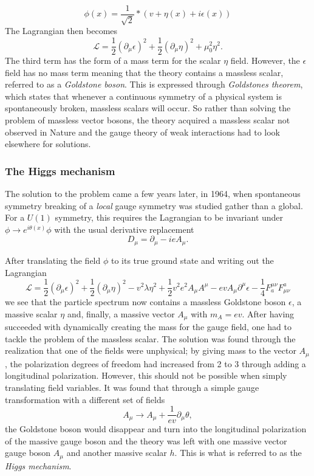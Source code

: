 \begin{equation}
\phi(x) = \frac{1}{\sqrt{2}}*(v+\eta(x)+i\epsilon(x))
\end{equation}
 The Lagrangian then becomes
\begin{equation}
\mathcal{L} = \frac{1}{2}(\partial_{\mu}\epsilon)^2 + \frac{1}{2}(\partial_{\mu}\eta)^2+\mu_0^2\eta^2.
\end{equation}
The third term has the form of a mass term for the scalar $\eta$ field. However, the $\epsilon$ field has no mass term meaning that the theory contains a massless scalar, referred to as a \emph{Goldstone boson}. This is expressed through \emph{Goldstones theorem}, which states that whenever a continuous symmetry of a physical system is spontaneously broken, massless scalars will occur. So rather than solving the problem of massless vector bosons, the theory acquired a massless scalar not observed in Nature and the gauge theory of weak interactions had to look elsewhere for solutions.

\subsubsection{The Higgs mechanism}
The solution to the problem came a few years later, in 1964, when spontaneous symmetry breaking of a \emph{local} gauge symmetry was studied gather than a global. For a $U(1)$ symmetry, this requires the Lagrangian to be invariant under $\phi \rightarrow e^{i\theta(x)}\phi$ with the usual derivative replacement
\begin{equation}
D_{\mu}=\partial_{\mu}-ie A_{\mu}.
\end{equation}

After translating the field $\phi$ to its true ground state and writing out the Lagrangian
\begin{equation}
  \label{eq:theory:higgsL}
\mathcal{L} = \frac{1}{2}(\partial_{\mu}\epsilon)^2 + \frac{1}{2}(\partial_{\mu}\eta)^2-v^2\lambda \eta^2+\frac{1}{2}v^2 e^2 A_{\mu} A^{\mu}-ev A_{\mu}\partial^{\mu}\epsilon-\frac{1}{4}F_{a}^{\mu\nu}F^{a}_{\mu\nu}
\end{equation}
we see that the particle spectrum now contains a massless Goldstone boson $\epsilon$, a massive scalar $\eta$ and, finally, a massive vector $A_{\mu}$ with $m_A=ev$. After having succeeded with dynamically creating the mass for the gauge field, one had to tackle the problem of the massless scalar. The solution was found through the realization that one of the fields were unphysical; by giving mass to the vector $A_{\mu}$, the polarization degrees of freedom had increased from 2 to 3 through adding a longitudinal polarization. However, this should not be possible when simply translating field variables. It was found that through a simple gauge transformation with a different set of fields
\begin{equation}
A_{\mu} \rightarrow A_{\mu}+\frac{1}{ev}\partial_{\mu}\theta,
\end{equation}
the Goldstone boson would disappear and turn into the longitudinal polarization of the massive gauge boson and the theory was left with one massive vector gauge boson $A_{\mu}$ and another massive scalar $h$. This is what is referred to as the \emph{Higgs mechanism}.

